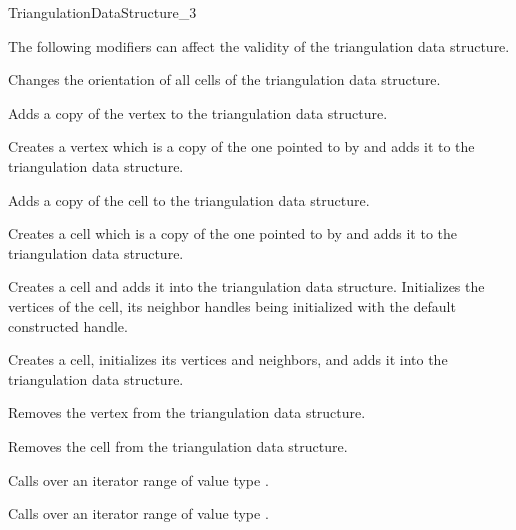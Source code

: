 \begin{ccRefConcept}{TriangulationDataStructure_3}
\begin{ccAdvanced}
The following modifiers can affect the validity of the triangulation
data structure.

{Changes the orientation of all cells of the triangulation data structure.
}

{Adds a copy of the vertex  to the triangulation data structure.}

{Creates a vertex which is a copy of the one pointed to by 
and adds it to the triangulation data structure.}

{Adds a copy of the cell  to the triangulation data structure.}

{Creates a cell which is a copy of the one pointed to by 
and adds it to the triangulation data structure.}

{Creates a cell and adds it into the triangulation data
structure. Initializes the vertices of the cell, its neighbor handles
being initialized with the default constructed handle.}

{Creates a cell, initializes its vertices and neighbors, and adds it
into the triangulation data structure.}

{Removes the vertex from the triangulation data structure.
}

{Removes the cell from the triangulation data structure.
}

{Calls  over an iterator range of value type
.}

{Calls  over an iterator range of value type
.}


\end{ccAdvanced}
\end{ccRefConcept}
